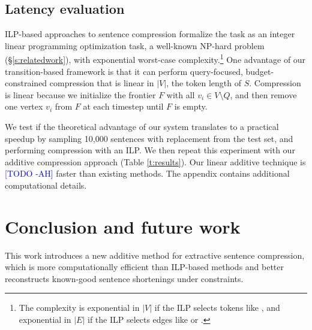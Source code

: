\documentclass[11pt,a4paper]{article}
\newcommand{\ahcomment}[1]{\textcolor{blue}{[#1 -AH]}}
\begin{document}
\subsection{Latency evaluation}\label{s:costs}

ILP-based approaches to sentence compression formalize the task as an integer linear programming optimization task, a well-known NP-hard problem  (\S\ref{s:relatedwork}), with exponential worst-case complexity.\footnote{The complexity is exponential in $|V|$ if the ILP selects tokens like \citet{clarke2008global}, and exponential in $|E|$ if the ILP selects edges like \citet{filippova2008dependency} or \citet{filippova2013overcoming}.} One advantage of our transition-based framework is that it can perform query-focused, budget-constrained compression that is linear in $|V|$, the token length of $S$. Compression is linear because we initialize the frontier $F$ with all $v_i \in V \setminus Q$, and then remove one vertex $v_i$ from $F$ at each timestep until $F$ is empty.

We test if the theoretical advantage of our system translates to a practical speedup by sampling 10,000 sentences with replacement from the test set, and performing compression with an ILP. We then repeat this experiment with our additive compression approach (Table \ref{t:results}). Our linear additive technique is \ahcomment{TODO} faster than existing methods. The appendix contains additional computational details.

\section{Conclusion and future work}

This work introduces a new additive method for extractive sentence compression, which is more computationally efficient than ILP-based methods and better reconstructs known-good sentence shortenings under constraints. 



%



\end{document}
